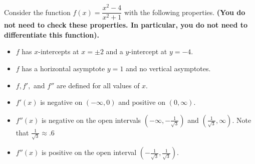\documentclass[11pt, addpoints]{exam}
\begin{document}
\begin{questions}
\question Consider the function $f(x) = \dfrac{x^2-4}{x^2+1}$ with the following properties. \textbf{(You do not need to check these properties. In particular, you do not need to differentiate this function).}
\begin{itemize}
    \item $f$ has $x$-intercepts at $x=\pm 2$ and a $y$-intercept at $y=-4$.
    \item $f$ has a horizontal asymptote $y=1$ and no vertical asymptotes.
    \item $f, f',$ and $f''$ are defined for all values of $x$.
    \item $f'(x)$ is negative on $(-\infty,0)$ and positive on $(0,\infty)$.
    \item $f''(x)$ is negative on the open intervals $\left(-\infty,-\frac{1}{\sqrt{3}}\right)$ and $\left(\frac{1}{\sqrt{3}},\infty\right)$. Note that $\frac{1}{\sqrt{3}}\approx .6$
    \item $f''(x)$ is positive on the open interval $\left( -\frac{1}{\sqrt{3}},\frac{1}{\sqrt{3}}\right).$
\end{itemize}
\addpoints
{}
\pagebreak


\end{questions}
\end{document}
